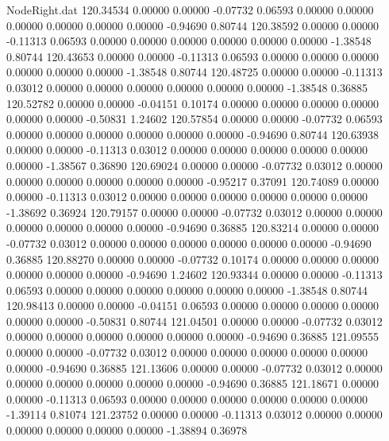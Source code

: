 \begin{filecontents}{NodeRight.dat}
 120.34534    0.00000    0.00000    -0.07732    0.06593    0.00000    0.00000    0.00000    0.00000    0.00000    0.00000   -0.94690    0.80744
 120.38592    0.00000    0.00000    -0.11313    0.06593    0.00000    0.00000    0.00000    0.00000    0.00000    0.00000   -1.38548    0.80744
 120.43653    0.00000    0.00000    -0.11313    0.06593    0.00000    0.00000    0.00000    0.00000    0.00000    0.00000   -1.38548    0.80744
 120.48725    0.00000    0.00000    -0.11313    0.03012    0.00000    0.00000    0.00000    0.00000    0.00000    0.00000   -1.38548    0.36885
 120.52782    0.00000    0.00000    -0.04151    0.10174    0.00000    0.00000    0.00000    0.00000    0.00000    0.00000   -0.50831    1.24602
 120.57854    0.00000    0.00000    -0.07732    0.06593    0.00000    0.00000    0.00000    0.00000    0.00000    0.00000   -0.94690    0.80744
 120.63938    0.00000    0.00000    -0.11313    0.03012    0.00000    0.00000    0.00000    0.00000    0.00000    0.00000   -1.38567    0.36890
 120.69024    0.00000    0.00000    -0.07732    0.03012    0.00000    0.00000    0.00000    0.00000    0.00000    0.00000   -0.95217    0.37091
 120.74089    0.00000    0.00000    -0.11313    0.03012    0.00000    0.00000    0.00000    0.00000    0.00000    0.00000   -1.38692    0.36924
 120.79157    0.00000    0.00000    -0.07732    0.03012    0.00000    0.00000    0.00000    0.00000    0.00000    0.00000   -0.94690    0.36885
 120.83214    0.00000    0.00000    -0.07732    0.03012    0.00000    0.00000    0.00000    0.00000    0.00000    0.00000   -0.94690    0.36885
 120.88270    0.00000    0.00000    -0.07732    0.10174    0.00000    0.00000    0.00000    0.00000    0.00000    0.00000   -0.94690    1.24602
 120.93344    0.00000    0.00000    -0.11313    0.06593    0.00000    0.00000    0.00000    0.00000    0.00000    0.00000   -1.38548    0.80744
 120.98413    0.00000    0.00000    -0.04151    0.06593    0.00000    0.00000    0.00000    0.00000    0.00000    0.00000   -0.50831    0.80744
 121.04501    0.00000    0.00000    -0.07732    0.03012    0.00000    0.00000    0.00000    0.00000    0.00000    0.00000   -0.94690    0.36885
 121.09555    0.00000    0.00000    -0.07732    0.03012    0.00000    0.00000    0.00000    0.00000    0.00000    0.00000   -0.94690    0.36885
 121.13606    0.00000    0.00000    -0.07732    0.03012    0.00000    0.00000    0.00000    0.00000    0.00000    0.00000   -0.94690    0.36885
 121.18671    0.00000    0.00000    -0.11313    0.06593    0.00000    0.00000    0.00000    0.00000    0.00000    0.00000   -1.39114    0.81074
 121.23752    0.00000    0.00000    -0.11313    0.03012    0.00000    0.00000    0.00000    0.00000    0.00000    0.00000   -1.38894    0.36978

\end{filecontents}
